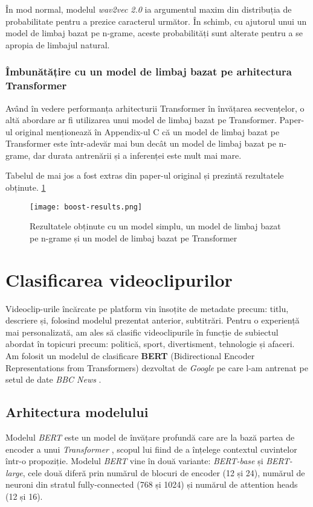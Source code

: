 \par
În mod normal, modelul \textit{wav2vec 2.0} ia argumentul maxim din distribuția de probabilitate
pentru a prezice caracterul următor. În schimb, cu ajutorul unui un model de limbaj bazat pe n-grame,
aceste probabilități sunt alterate pentru a se apropia de limbajul natural. 

\subsubsection{Îmbunătățire cu un model de limbaj bazat pe arhitectura Transformer}
\vspace{1em}
Având în vedere performanța arhitecturii Transformer în învățarea secvențelor, o altă abordare
ar fi utilizarea unui model de limbaj bazat pe Transformer. Paper-ul original \cite{wav2vec2}
menționează în Appendix-ul C că un model de limbaj bazat pe Transformer este într-adevăr mai
bun decât un model de limbaj bazat pe n-grame, dar durata antrenării și a inferenței este
mult mai mare. 
\par 
Tabelul de mai jos a fost extras din paper-ul original și prezintă rezultatele obținute. \ref{fig:boost-results}

\begin{figure}[h!]
    \centering
    \texttt{[image: boost-results.png]}
    \caption{Rezultatele obținute cu un model simplu, un model de limbaj bazat pe n-grame și un model de limbaj bazat pe Transformer}
    \label{fig:boost-results}
\end{figure}


\section{Clasificarea videoclipurilor}
\label{sec:clasificare-videoclipuri}
Videoclip-urile încărcate pe platform vin însoțite de metadate precum: titlu, descriere și, folosind
modelul prezentat anterior, subtitrări. Pentru o experiență mai personalizată, am ales să clasific
videoclipurile în funcție de subiectul abordat în topicuri precum: politică, sport, divertisment,
tehnologie și afaceri. Am folosit un modelul de clasificare \textbf{BERT} (Bidirectional Encoder Representations
from Transformers) dezvoltat de \textit{Google} \cite{devlin2019bert} pe care l-am antrenat pe setul de date
\textit{BBC News} \cite{greene06icml}.

\subsection{Arhitectura modelului}
Modelul \textit{BERT} este un model de învățare profundă care are la bază partea de encoder a unui \textit{Transformer} \cite{vaswani2023attention},
scopul lui fiind de a înțelege contextul cuvintelor într-o propoziție. Modelul \textit{BERT} vine în două
variante: \textit{BERT-base} și \textit{BERT-large}, cele două diferă prin numărul de blocuri de encoder (12 și 24),
numărul de neuroni din stratul fully-connected (768 și 1024) și numărul de attention heads (12 și 16).

